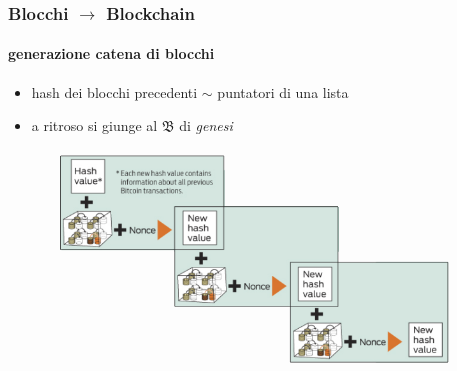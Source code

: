 \begin{frame}
	\frametitle{Blocchi $\rightarrow$ Blockchain} 
	\framesubtitle{generazione catena di blocchi}
	
		\begin{itemize}
			\item hash dei blocchi precedenti \vspace{1pt} $\sim$ \vspace{1pt} puntatori di una lista
			\item a ritroso si giunge al $\mathfrak{B}$ di \textit{genesi}
		\end{itemize}
		
	 	\begin{figure}[H]
			\begin{center}
				\includegraphics[height = 4.5 cm]{images/blockchain.png}	
			\end{center}
		\end{figure}

\end{frame}
